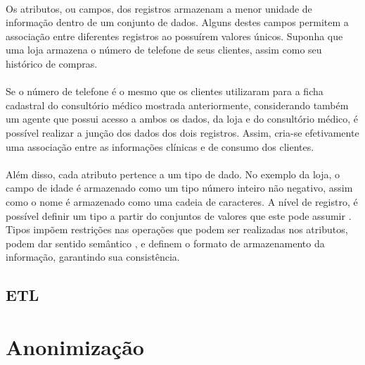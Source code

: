 \paragraph{} Os atributos, ou campos, dos registros armazenam a menor unidade de informação dentro de um conjunto de dados.
Alguns destes campos permitem a associação entre diferentes registros ao possuírem valores únicos. 
Suponha que uma loja armazena o número de telefone 
de seus clientes, assim como seu histórico de compras. 

\paragraph{} Se o número de telefone é o mesmo que os clientes utilizaram para a ficha cadastral do consultório 
médico mostrada anteriormente, considerando também um agente que possui acesso a ambos os dados, da loja e do 
consultório médico, é possível realizar a junção dos dados dos dois registros. Assim, cria-se efetivamente uma associação 
entre as informações clínicas e de consumo dos clientes.

\paragraph{} Além disso, cada atributo pertence a um tipo de dado. No exemplo da loja, o campo de idade é armazenado 
como um tipo número inteiro não negativo, assim como o nome é armazenado como uma cadeia de caracteres.
A nível de registro, é possível definir um tipo a partir do conjuntos de valores que este pode assumir \cite{cardelli1985types}. 
Tipos impõem restrições nas operações que podem ser realizadas nos atributos, podem dar sentido semântico \cite{donahue1979semantics},
e definem o formato de armazenamento da informação, garantindo sua consistência.




\subsection{ETL}

\section{Anonimização}


